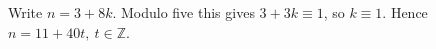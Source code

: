 Write $ n=3+8k $. Modulo five this gives $ 3+3k\equiv1 $, so $ k\equiv1 $. Hence $\boxed{n=11+40t,\ t\in\mathbb Z}$.
